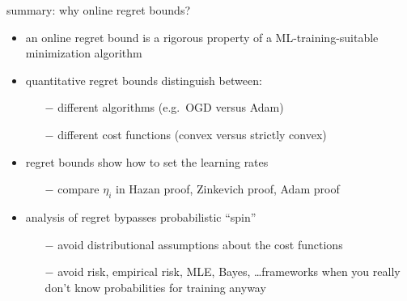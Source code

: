 \documentclass[xcolor={svgnames},
               hyperref={colorlinks,citecolor=DeepPink4,linkcolor=FireBrick,urlcolor=Maroon}]
               {beamer}
\begin{document}
\begin{frame}{\alert{summary}: why online regret bounds?}

\begin{itemize}
\item an online regret bound is a rigorous property of a ML-training-suitable minimization algorithm
\item quantitative regret bounds distinguish between:
    \begin{itemize}
    \item[$-$] different algorithms (e.g.~OGD versus Adam)
    \item[$-$] different cost functions (convex versus strictly convex)
    \end{itemize}
\item regret bounds show how to set the learning rates
    \begin{itemize}
    \item[$-$] compare $\eta_i$ in Hazan proof, Zinkevich proof, Adam proof
    \end{itemize}
\item analysis of regret bypasses probabilistic ``spin''
    \begin{itemize}
    \item[$-$] avoid distributional assumptions about the cost functions
    \item[$-$] avoid risk, empirical risk, MLE, Bayes, \dots frameworks when you really don't know probabilities for training anyway
    \end{itemize}
\end{itemize}
\end{frame}
\end{document}
